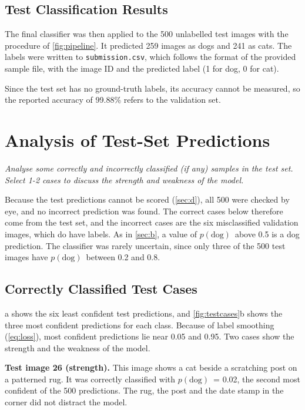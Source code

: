 \documentclass[11pt,a4paper]{article}
\newenvironment{question}
  {\par\smallskip\noindent\begin{lrbox}{\questionbox}%
   \begin{minipage}{\dimexpr\linewidth-2\fboxsep-2\fboxrule\relax}\small\itshape}
  {\end{minipage}\end{lrbox}%
   \fcolorbox{gray!45}{gray!7}{\usebox{\questionbox}}\par\smallskip}
\newcommand{\pct}[1]{#1\%}
\newcommand{\pdog}{$p(\mathrm{dog})$}
\begin{document}
\subsection*{Test Classification Results}

The final classifier was then applied to the 500 unlabelled test images with the procedure of \cref{fig:pipeline}. It predicted 259 images as dogs and 241 as cats. The labels were written to \texttt{submission.csv}, which follows the format of the provided sample file, with the image ID and the predicted label (1 for dog, 0 for cat).

Since the test set has no ground-truth labels, its accuracy cannot be measured, so the reported accuracy of \pct{99.88} refers to the validation set.

\section{Analysis of Test-Set Predictions}\label{sec:e}

\begin{question}
Analyse some correctly and incorrectly classified (if any) samples in the test set. Select 1-2 cases to discuss the strength and weakness of the model.
\end{question}

Because the test predictions cannot be scored (\cref{sec:d}), all 500 were checked by eye, and no incorrect prediction was found. The correct cases below therefore come from the test set, and the incorrect cases are the six misclassified validation images, which do have labels. As in \cref{sec:b}, a value of \pdog\ above 0.5 is a dog prediction. The classifier was rarely uncertain, since only three of the 500 test images have \pdog\ between 0.2 and 0.8.

\subsection*{Correctly Classified Test Cases}

a shows the six least confident test predictions, and \cref{fig:testcases}b shows the three most confident predictions for each class. Because of label smoothing (\cref{eq:loss}), most confident predictions lie near 0.05 and 0.95. Two cases show the strength and the weakness of the model.

\textbf{Test image 26 (strength).} This image shows a cat beside a scratching post on a patterned rug. It was correctly classified with \pdog\ = 0.02, the second most confident of the 500 predictions. The rug, the post and the date stamp in the corner did not distract the model. 
\end{document}
